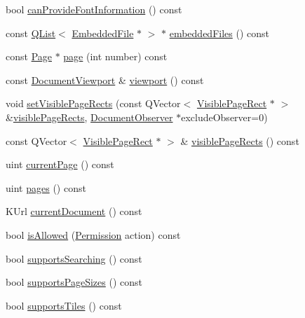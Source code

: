 \begin{DoxyCompactItemize}
bool \hyperlink{classOkular_1_1Document_a8c43c3aa0d740b48813bfbd5deec7f1c}{can\+Provide\+Font\+Information} () const 
\item 
const \hyperlink{classQList}{Q\+List}$<$ \hyperlink{classOkular_1_1EmbeddedFile}{Embedded\+File} $\ast$ $>$ $\ast$ \hyperlink{classOkular_1_1Document_a0d0f25adc4dab338160d951a2fafd2d3}{embedded\+Files} () const 
\item 
const \hyperlink{classOkular_1_1Page}{Page} $\ast$ \hyperlink{classOkular_1_1Document_a1c95c2f192d739c217d00971da48f69d}{page} (int number) const 
\item 
const \hyperlink{classOkular_1_1DocumentViewport}{Document\+Viewport} \& \hyperlink{classOkular_1_1Document_abb8738de0a53aa4a9f552de0e1e749f8}{viewport} () const 
\item 
void \hyperlink{classOkular_1_1Document_abab90bff378407416b00be2f2de278bf}{set\+Visible\+Page\+Rects} (const Q\+Vector$<$ \hyperlink{classOkular_1_1VisiblePageRect}{Visible\+Page\+Rect} $\ast$ $>$ \&\hyperlink{classOkular_1_1Document_a2ba56fa52cfacc10267896938a2ac37b}{visible\+Page\+Rects}, \hyperlink{classOkular_1_1DocumentObserver}{Document\+Observer} $\ast$exclude\+Observer=0)
\item 
const Q\+Vector$<$ \hyperlink{classOkular_1_1VisiblePageRect}{Visible\+Page\+Rect} $\ast$ $>$ \& \hyperlink{classOkular_1_1Document_a2ba56fa52cfacc10267896938a2ac37b}{visible\+Page\+Rects} () const 
\item 
uint \hyperlink{classOkular_1_1Document_a42ec374d73794bf56d7e7b11f1f56319}{current\+Page} () const 
\item 
uint \hyperlink{classOkular_1_1Document_aaf5d986758e25127946986abaa401bcd}{pages} () const 
\item 
K\+Url \hyperlink{classOkular_1_1Document_acb6f05a191623dafbdf5d4788dd98fed}{current\+Document} () const 
\item 
bool \hyperlink{classOkular_1_1Document_a6dd7a475b14222c07d1c410311f35cdb}{is\+Allowed} (\hyperlink{namespaceOkular_a3601f4e702453ddf1125476dd6e7577b}{Permission} action) const 
\item 
bool \hyperlink{classOkular_1_1Document_acadcf633db6332012dbbd1914fddd0c9}{supports\+Searching} () const 
\item 
bool \hyperlink{classOkular_1_1Document_abda5404bb65d7bc671494e589dec3aaf}{supports\+Page\+Sizes} () const 
\item 
bool \hyperlink{classOkular_1_1Document_a195dd7b2d52ecaf17541a437d5f9e579}{supports\+Tiles} () const 
\item 

\end{DoxyCompactItemize}
